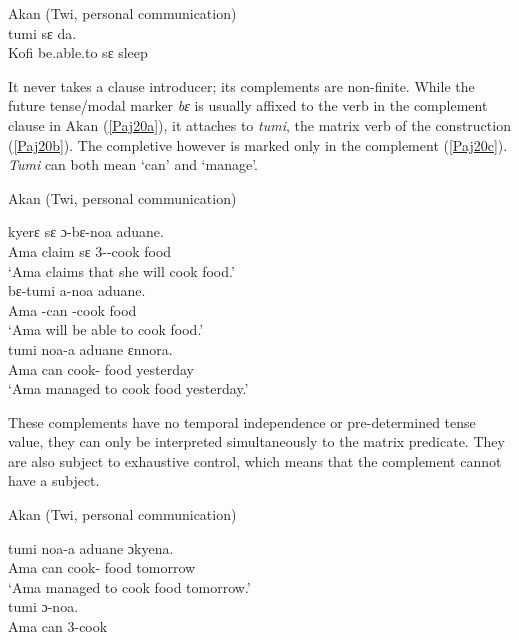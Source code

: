 \documentclass[output=paper]{langscibook}
\begin{document}
\begin{exe}
\ex \label{Paj17} Akan (Twi, personal communication) \\ 
 {tumi} {s{ɛ}} {da}.\\
    Kofi be.able.to s{ɛ} sleep\\
\end{exe}


It never takes a clause introducer; its complements are non-finite. While the future tense/modal marker \emph{bɛ} is usually affixed to the verb in the complement clause in Akan (\ref{Paj20a}), it attaches to \emph{tumi}, the matrix verb of the construction (\ref{Paj20b}). The completive however is marked only in the complement (\ref{Paj20c}). \emph{Tumi} can both mean ‘can’ and ‘manage’. 

\begin{exe}
\ex \label{Paj18} Akan (Twi, personal communication)
\begin{xlist}

\ex \label{Paj18a} 
 {kyer{ɛ}} {s{ɛ}} {{ɔ}-b{ɛ}-noa} {aduane.}\\
  Ama claim s{ɛ} 3{\sg}--cook food\\
\glt `Ama claims that she will cook food.'\\

\ex \label{Paj18b} 
 {b{ɛ}-tumi} {a-noa} {aduane.}\\
  Ama -can -cook food\\
\glt `Ama will be able to cook food.'\\

\ex \label{Paj18c} 
 {tumi} {noa-a} {aduane} {{ɛ}nnora.}\\
  Ama can cook-{\comp} food yesterday\\
\glt `Ama managed to cook food yesterday.'\\


\end{xlist}
\end{exe}
 

These complements have no temporal independence or pre-determined tense value, they can only be interpreted simultaneously to the matrix predicate. They are also subject to exhaustive control, which means that the complement cannot have a subject. 

\begin{exe}
\ex \label{Paj19} Akan (Twi, personal communication)
\begin{xlist}

\ex \label{Paj19a} 
 {tumi} {noa-a} {aduane} {{ɔ}kyena}.\\
  Ama can cook-{\compl} food tomorrow\\
\glt `Ama managed to cook food tomorrow.'\\

\ex \label{Paj19b} 
 {tumi} {{ɔ}-noa}.\\
  Ama can 3{\sg}-cook\\

\end{xlist}
\end{exe}
 
\end{document}
